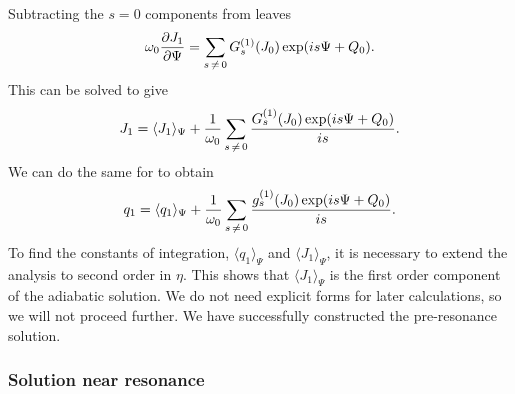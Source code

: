 Subtracting the $s = 0$ components from  leaves
\begin{equation}
\omega_0\dfrac{\partial {J_1}}{\partial {\Psi}} = \sum_{s\,\neq\,0} G_s^{(1)}(J_0)\exp(is \Psi + Q_0).
\end{equation}
This can be solved to give
\begin{equation}
J_1 = \langle J_1\rangle_\Psi + \dfrac{1}{\omega_0}\sum_{s\,\neq\,0} \dfrac{G_s^{(1)}(J_0)\exp(is \Psi + Q_0)}{is}.
\label{eq:J-1-sol}
\end{equation}
We can do the same for  to obtain
\begin{equation}
q_1 = \langle q_1\rangle_\Psi + \dfrac{1}{\omega_0}\sum_{s\,\neq\,0} \dfrac{g_s^{(1)}(J_0)\exp(is \Psi + Q_0)}{is}.
\label{eq:q-1-sol}
\end{equation}
To find the constants of integration, $\langle q_1\rangle_\Psi$ and $\langle J_1\rangle_\Psi$, it is necessary to extend the analysis to second order in $\eta$. This shows that $\langle J_1\rangle_\Psi$ is the first order component of the adiabatic solution. We do not need explicit forms for later calculations, so we will not proceed further. We have successfully constructed the pre-resonance solution.

\subsubsection{Solution near resonance}\label{sec:interior-res}

